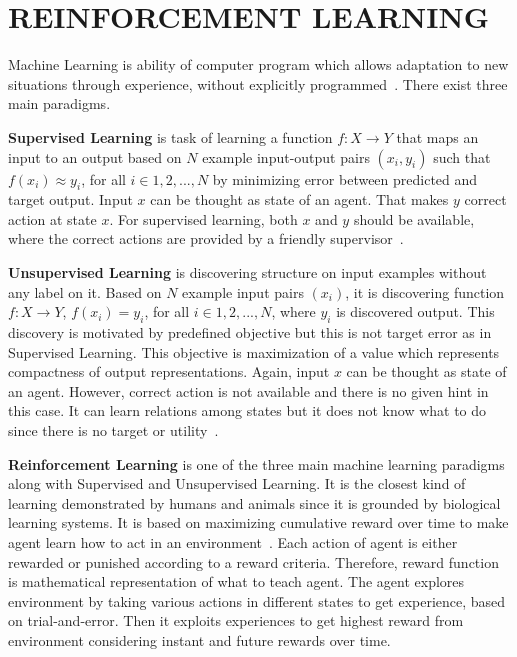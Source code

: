 \chapter{REINFORCEMENT LEARNING}
\label{chap:rl_chap}

Machine Learning is ability of computer program which allows 
adaptation to new situations through experience, 
without explicitly programmed~\cite{mitchell_machine_1997}. 
There exist three main paradigms. 

\textbf{Supervised Learning} is task of learning a function $f \colon X \rightarrow Y$ 
that maps an input to an output based on $N$ example input-output pairs $(x_i,y_i)$ 
such that $ f(x_i) \approx y_i$, for all $i \in {1,2,...,N}$ 
by minimizing error between predicted and target output. 
Input $x$ can be thought as state of an agent. 
That makes $y$ correct action at state $x$. 
For supervised learning, both $x$ and $y$ should be available, 
where the correct actions are provided by a friendly supervisor~\cite{russell_artificial_nodate}. 

\textbf{Unsupervised Learning} is discovering structure on input examples without any label on it. 
Based on $N$ example input pairs $(x_i)$, 
it is discovering function $f \colon X \rightarrow Y$, $ f(x_i) = y_i$, for all $i \in {1,2,...,N} $, 
where $y_i$ is discovered output. 
This discovery is motivated by predefined objective but this is not target error as in Supervised Learning. 
This objective is maximization of a value which represents compactness of output representations. 
Again, input $x$ can be thought as state of an agent. 
However, correct action is not available and there is no given hint in this case. 
It can learn relations among states but it does not know what to do 
since there is no target or utility~\cite{russell_artificial_nodate}.
 
\textbf{Reinforcement Learning} is one of the three main machine learning paradigms along with Supervised and Unsupervised Learning. 
It is the closest kind of learning demonstrated by humans and animals 
since it is grounded by biological learning systems. 
It is based on maximizing cumulative reward over time to make agent 
learn how to act in an environment~\cite{sutton_reinforcement_1998}. 
Each action of agent is either rewarded or punished according to a reward criteria. 
Therefore, reward function is mathematical representation of what to teach agent. 
The agent explores environment by taking various actions in different states to get experience, based on trial-and-error. 
Then it exploits experiences to get highest reward from environment considering instant and future rewards over time. 

